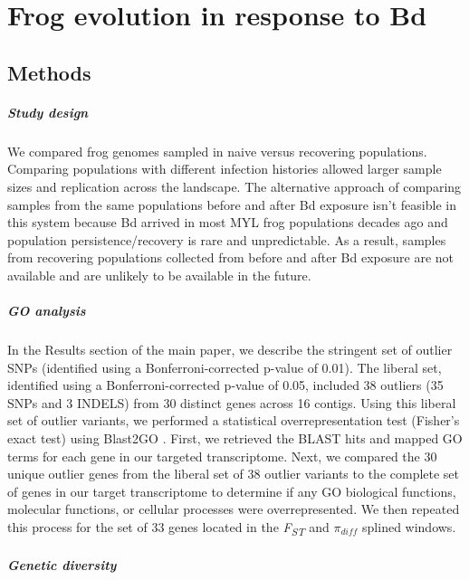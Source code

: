 \documentclass[9pt,twoside,lineno]{pnas-new}
\begin{document}
\hypertarget{frog-evolution-in-response-to-bd-2}{%
\section{Frog evolution in response to
Bd}\label{frog-evolution-in-response-to-bd-2}}

\hypertarget{methods}{%
\subsection{Methods}\label{methods}}

\hypertarget{study-design}{%
\subparagraph{Study design}\label{study-design}}

We compared frog genomes sampled in naive versus recovering populations.
Comparing populations with different infection histories allowed larger
sample sizes and replication across the landscape. The alternative
approach of comparing samples from the same populations before and after
Bd exposure isn't feasible in this system because Bd arrived in most MYL
frog populations decades ago and population persistence/recovery is rare
and unpredictable. As a result, samples from recovering populations
collected from before and after Bd exposure are not available and are
unlikely to be available in the future.

\hypertarget{go-analysis}{%
\subparagraph{GO analysis}\label{go-analysis}}

In the Results section of the main paper, we describe the stringent set
of outlier SNPs (identified using a Bonferroni-corrected p-value of
0.01). The liberal set, identified using a Bonferroni-corrected p-value
of 0.05, included 38 outliers (35 SNPs and 3 INDELS) from 30 distinct
genes across 16 contigs. Using this liberal set of outlier variants, we
performed a statistical overrepresentation test (Fisher's exact test)
using Blast2GO \citep{conesa2005}. First, we retrieved the BLAST hits
and mapped GO terms for each gene in our targeted transcriptome. Next,
we compared the 30 unique outlier genes from the liberal set of 38
outlier variants to the complete set of genes in our target
transcriptome to determine if any GO biological functions, molecular
functions, or cellular processes were overrepresented. We then repeated
this process for the set of 33 genes located in the
\emph{F\textsubscript{ST}} and \(\pi_{diff}\) splined windows.

\hypertarget{genetic-diversity}{%
\subparagraph{Genetic diversity}\label{genetic-diversity}}
\end{document}
